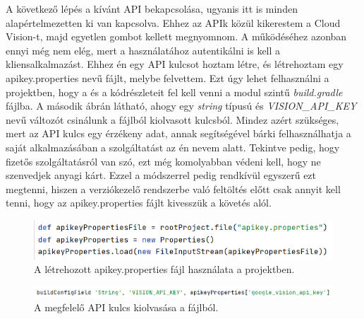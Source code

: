 A következő lépés a kívánt API bekapcsolása, ugyanis itt is minden alapértelmezetten ki van kapcsolva. Ehhez az APIk közül kikerestem a Cloud Vision-t, majd egyetlen gombot kellett megnyomnom. A működéséhez azonban ennyi még nem elég, mert a használatához autentikálni is kell a kliensalkalmazást. Ehhez én egy API kulcsot hoztam létre, és létrehoztam egy apikey.properties nevű fájlt, melybe felvettem. Ezt úgy lehet felhasználni a projektben, hogy a  és a  kódrészleteit fel kell venni a modul szintű \emph{build.gradle} fájlba. A második ábrán látható, ahogy egy \emph{string} típusú és \emph{VISION\_API\_KEY} nevű változót csinálunk a fájlból kiolvasott kulcsból. Mindez azért szükséges, mert az API kulcs egy érzékeny adat, annak segítségével bárki felhasználhatja a saját alkalmazásában a szolgáltatást az én nevem alatt. Tekintve pedig, hogy fizetős szolgáltatásról van szó, ezt még komolyabban védeni kell, hogy ne szenvedjek anyagi kárt. Ezzel a módszerrel pedig rendkívül egyszerű ezt megtenni, hiszen a verziókezelő rendszerbe való feltöltés előtt csak annyit kell tenni, hogy az apikey.properties fájlt kivesszük a követés alól. 

\begin{figure}[!ht]
	\centering
	\includegraphics[width=120mm, keepaspectratio]{figures/gradle_apikey.png}
	\caption{A létrehozott apikey.properties fájl használata a projektben.}
	\label{fig:ApiKey}
\end{figure}

\begin{figure}[!ht]
	\centering
	\includegraphics[width=130mm, keepaspectratio]{figures/apikey_configfield.png}
	\caption{A megfelelő API kulcs kiolvasása a fájlból.}
	\label{fig:ApiKeyConfig}
\end{figure}

